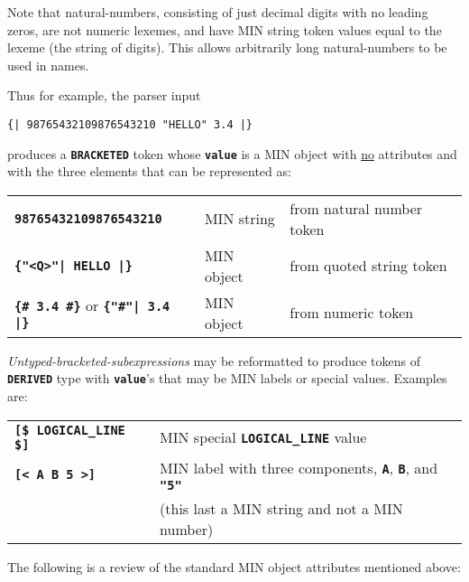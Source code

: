 \documentclass[12pt]{article}
\newcommand{\TT}[1]{{\tt \bfseries #1}}
\begin{document}
Note that natural-numbers, consisting of just decimal digits
with no leading zeros, are not numeric lexemes, and have MIN string
token values equal to the lexeme (the string of digits).  This allows
arbitrarily long natural-numbers to be used in names.

Thus for example, the parser input
\begin{center}
\tt \{| 98765432109876543210 "HELLO" 3.4 |\}
\end{center}
produces a \TT{BRACKETED} token whose \TT{value} is a MIN object with
\underline{no} attributes and with the three elements that
can be represented as:
\begin{center}
\begin{tabular}{lll}
\TT{98765432109876543210}	& MIN string	& from natural number token \\
\TT{\{"<Q>"| HELLO |\}}		& MIN object	& from quoted string token \\
\TT{\{\# 3.4 \#\}} or \TT{\{"\#"| 3.4 |\}}
				& MIN object	& from numeric token \\
\end{tabular}
\end{center}

{\em Untyped-bracketed-subexpressions} may be reformatted to
produce tokens of \TT{DERIVED} type with \TT{value}'s that may be
MIN labels or special values.  Examples are:
\begin{center}
\begin{tabular}{ll}
\TT{[\$ LOGICAL\_LINE \$]}	& MIN special \TT{LOGICAL\_LINE} value \\
\TT{[< A B 5 >]}	& MIN label with three components, \TT{A}, \TT{B},
			  and \TT{"5"} \\
			& (this last a MIN string and not a MIN number) \\
\end{tabular}
\end{center}

The following is a review of the standard MIN object attributes
mentioned above:
\end{document}

